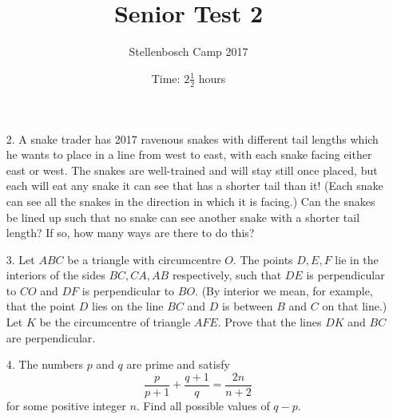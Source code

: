 \documentclass{article}
\title{Senior Test 2}
\author{Stellenbosch Camp 2017}
\date{Time: $2\frac{1}{2}$ hours}
\begin{document}
 \maketitle

\begin{enumerate}

\item[2.] %
A snake trader has 2017 ravenous snakes with different tail lengths which he wants to place in a line from west to east, with each snake facing either east or west. The snakes are well-trained and will stay still once placed, but each will eat any snake it can see that has a shorter tail than it! (Each snake can see all the snakes in the direction in which it is facing.) Can the snakes be lined up such that no snake can see another snake with a shorter tail length? If so, how many ways are there to do this?

\item[3.] %
Let $ABC$ be a triangle with circumcentre $O$. The points $D,E,F$ lie in the interiors of the sides $BC,CA,AB$ respectively, such that $DE$ is perpendicular to $CO$ and $DF$ is perpendicular to $BO$. (By interior we mean, for example, that the point $D$ lies on the line $BC$ and $D$ is between $B$ and $C$ on that line.) Let $K$ be the circumcentre of triangle $AFE$. Prove that the lines $DK$ and $BC$ are perpendicular.

\item[4.] %
The numbers $p$ and $q$ are prime and satisfy
	\[\frac{p}{{p + 1}} + \frac{{q + 1}}{q} = \frac{{2n}}{{n + 2}}\]
for some positive integer $n$. Find all possible values of $q-p$.

\end{enumerate}
\end{document}
